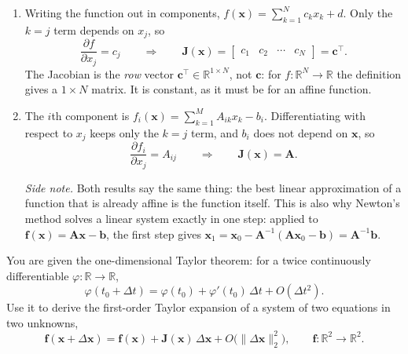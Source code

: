 \begin{solution}
    
    \begin{enumerate}[label=(\alph*)]
        \item Writing the function out in components, $f(\mathbf{x}) = \sum_{k=1}^{N} c_k x_k + d$. Only the $k = j$ term depends on $x_j$, so
        \[
            \frac{\partial f}{\partial x_j} = c_j
            \qquad \Longrightarrow \qquad
            \mathbf{J}(\mathbf{x}) = \begin{bmatrix} c_1 & c_2 & \cdots & c_N \end{bmatrix} = \mathbf{c}^\top .
        \]
        The Jacobian is the \emph{row} vector $\mathbf{c}^\top \in \mathbb{R}^{1 \times N}$, not $\mathbf{c}$: for $f : \mathbb{R}^N \to \mathbb{R}$ the definition gives a $1 \times N$ matrix. It is constant, as it must be for an affine function.
        \item The $i$th component is $f_i(\mathbf{x}) = \sum_{k=1}^{M} A_{ik} x_k - b_i$. Differentiating with respect to $x_j$ keeps only the $k = j$ term, and $b_i$ does not depend on $\mathbf{x}$, so
        \[
            \frac{\partial f_i}{\partial x_j} = A_{ij}
            \qquad \Longrightarrow \qquad
            \mathbf{J}(\mathbf{x}) = \mathbf{A} .
        \]

        \emph{Side note.} Both results say the same thing: the best linear approximation of a function that is already affine is the function itself. This is also why Newton's method solves a linear system exactly in one step: applied to $\mathbf{f}(\mathbf{x}) = \mathbf{A}\mathbf{x} - \mathbf{b}$, the first step gives $\mathbf{x}_1 = \mathbf{x}_0 - \mathbf{A}^{-1}(\mathbf{A}\mathbf{x}_0 - \mathbf{b}) = \mathbf{A}^{-1}\mathbf{b}$.
    \end{enumerate}
    
\end{solution}

\begin{exercise} %
    
    You are given the one-dimensional Taylor theorem: for a twice continuously differentiable $\varphi : \mathbb{R} \to \mathbb{R}$,
    \[
        \varphi(t_0 + \Delta t) = \varphi(t_0) + \varphi'(t_0)\, \Delta t + O(\Delta t^2) .
    \]
    Use it to derive the first-order Taylor expansion of a system of two equations in two unknowns,
    \[
        \mathbf{f}(\mathbf{x} + \Delta\mathbf{x}) = \mathbf{f}(\mathbf{x}) + \mathbf{J}(\mathbf{x})\, \Delta\mathbf{x} + O\big(\|\Delta\mathbf{x}\|_2^2\big),
        \qquad \mathbf{f} : \mathbb{R}^2 \to \mathbb{R}^2 .
    \]
    
\end{exercise}

